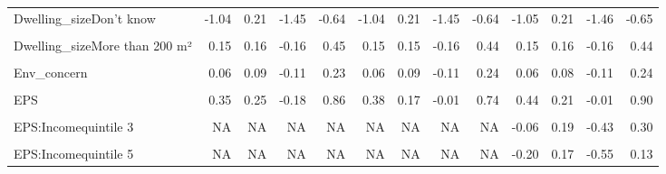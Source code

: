\begin{table}
\begin{tabular}[t]{lrrrrrrrrrrrr}
Dwelling\_sizeDon't know & -1.04 & 0.21 & -1.45 & -0.64 & -1.04 & 0.21 & -1.45 & -0.64 & -1.05 & 0.21 & -1.46 & -0.65\\
\cellcolor{gray!10}{Dwelling\_sizeLess than 25 m²} & \cellcolor{gray!10}{-0.51} & \cellcolor{gray!10}{0.38} & \cellcolor{gray!10}{-1.28} & \cellcolor{gray!10}{0.17} & \cellcolor{gray!10}{-0.51} & \cellcolor{gray!10}{0.36} & \cellcolor{gray!10}{-1.28} & \cellcolor{gray!10}{0.18} & \cellcolor{gray!10}{-0.52} & \cellcolor{gray!10}{0.37} & \cellcolor{gray!10}{-1.28} & \cellcolor{gray!10}{0.17}\\
Dwelling\_sizeMore than 200 m² & 0.15 & 0.16 & -0.16 & 0.45 & 0.15 & 0.15 & -0.16 & 0.44 & 0.15 & 0.16 & -0.16 & 0.44\\
\cellcolor{gray!10}{Rural} & \cellcolor{gray!10}{0.21} & \cellcolor{gray!10}{0.10} & \cellcolor{gray!10}{0.01} & \cellcolor{gray!10}{0.42} & \cellcolor{gray!10}{0.21} & \cellcolor{gray!10}{0.10} & \cellcolor{gray!10}{0.02} & \cellcolor{gray!10}{0.40} & \cellcolor{gray!10}{0.21} & \cellcolor{gray!10}{0.10} & \cellcolor{gray!10}{0.01} & \cellcolor{gray!10}{0.41}\\
Env\_concern & 0.06 & 0.09 & -0.11 & 0.23 & 0.06 & 0.09 & -0.11 & 0.24 & 0.06 & 0.08 & -0.11 & 0.24\\
\cellcolor{gray!10}{Gov\_support} & \cellcolor{gray!10}{12.76} & \cellcolor{gray!10}{3.86} & \cellcolor{gray!10}{8.14} & \cellcolor{gray!10}{24.17} & \cellcolor{gray!10}{12.72} & \cellcolor{gray!10}{3.74} & \cellcolor{gray!10}{8.03} & \cellcolor{gray!10}{23.63} & \cellcolor{gray!10}{12.86} & \cellcolor{gray!10}{3.79} & \cellcolor{gray!10}{8.28} & \cellcolor{gray!10}{23.86}\\
EPS & 0.35 & 0.25 & -0.18 & 0.86 & 0.38 & 0.17 & -0.01 & 0.74 & 0.44 & 0.21 & -0.01 & 0.90\\
\cellcolor{gray!10}{EPS:Incomequintile 2} & \cellcolor{gray!10}{NA} & \cellcolor{gray!10}{NA} & \cellcolor{gray!10}{NA} & \cellcolor{gray!10}{NA} & \cellcolor{gray!10}{NA} & \cellcolor{gray!10}{NA} & \cellcolor{gray!10}{NA} & \cellcolor{gray!10}{NA} & \cellcolor{gray!10}{0.02} & \cellcolor{gray!10}{0.19} & \cellcolor{gray!10}{-0.36} & \cellcolor{gray!10}{0.40}\\
EPS:Incomequintile 3 & NA & NA & NA & NA & NA & NA & NA & NA & -0.06 & 0.19 & -0.43 & 0.30\\
\cellcolor{gray!10}{EPS:Incomequintile 4} & \cellcolor{gray!10}{NA} & \cellcolor{gray!10}{NA} & \cellcolor{gray!10}{NA} & \cellcolor{gray!10}{NA} & \cellcolor{gray!10}{NA} & \cellcolor{gray!10}{NA} & \cellcolor{gray!10}{NA} & \cellcolor{gray!10}{NA} & \cellcolor{gray!10}{0.03} & \cellcolor{gray!10}{0.19} & \cellcolor{gray!10}{-0.33} & \cellcolor{gray!10}{0.40}\\
EPS:Incomequintile 5 & NA & NA & NA & NA & NA & NA & NA & NA & -0.20 & 0.17 & -0.55 & 0.13\\
\bottomrule
\end{tabular}
\end{table}
